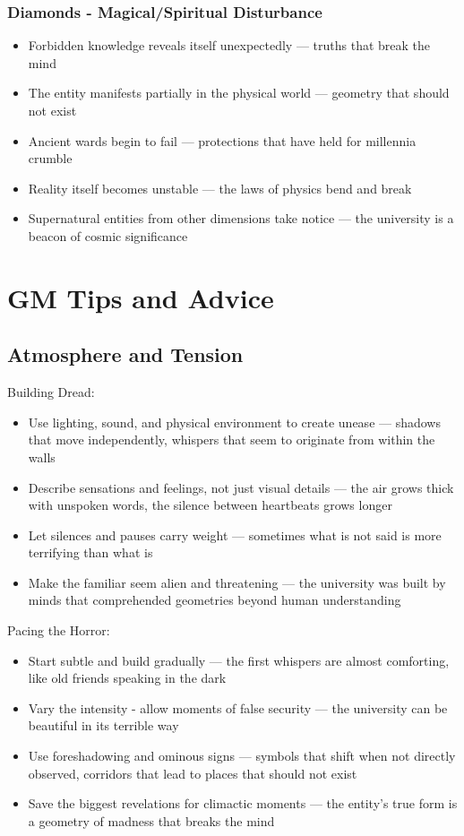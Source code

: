 \documentclass[11pt]{article}
\begin{document}
\subsubsection{Diamonds - Magical/Spiritual Disturbance}

\begin{itemize}
\item Forbidden knowledge reveals itself unexpectedly — truths that break the mind
\item The entity manifests partially in the physical world — geometry that should not exist
\item Ancient wards begin to fail — protections that have held for millennia crumble
\item Reality itself becomes unstable — the laws of physics bend and break
\item Supernatural entities from other dimensions take notice — the university is a beacon of cosmic significance
\end{itemize}

\section{GM Tips and Advice}

\subsection{Atmosphere and Tension}

Building Dread:
\begin{itemize}
\item Use lighting, sound, and physical environment to create unease — shadows that move independently, whispers that seem to originate from within the walls
\item Describe sensations and feelings, not just visual details — the air grows thick with unspoken words, the silence between heartbeats grows longer
\item Let silences and pauses carry weight — sometimes what is not said is more terrifying than what is
\item Make the familiar seem alien and threatening — the university was built by minds that comprehended geometries beyond human understanding
\end{itemize}

Pacing the Horror:
\begin{itemize}
\item Start subtle and build gradually — the first whispers are almost comforting, like old friends speaking in the dark
\item Vary the intensity - allow moments of false security — the university can be beautiful in its terrible way
\item Use foreshadowing and ominous signs — symbols that shift when not directly observed, corridors that lead to places that should not exist
\item Save the biggest revelations for climactic moments — the entity's true form is a geometry of madness that breaks the mind
\end{itemize}
\end{document}
